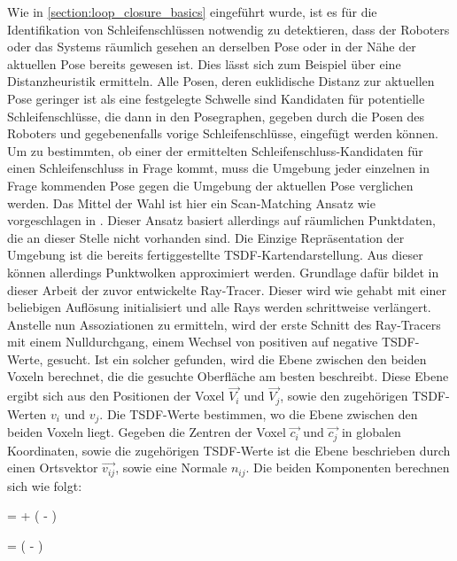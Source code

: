 Wie in \ref{section:loop_closure_basics} eingeführt wurde, ist es für die Identifikation von Schleifenschlüssen notwendig zu detektieren, dass der Roboters oder das Systems räumlich gesehen an derselben Pose oder in der Nähe der aktuellen Pose bereits gewesen ist. Dies lässt sich zum Beispiel über eine Distanzheuristik ermitteln. Alle Posen, deren euklidische Distanz zur aktuellen Pose geringer ist als eine festgelegte Schwelle sind Kandidaten für potentielle Schleifenschlüsse, die dann in den Posegraphen, gegeben durch die Posen des Roboters und gegebenenfalls vorige Schleifenschlüsse, eingefügt werden können. Um zu bestimmten, ob einer der ermittelten Schleifenschluss-Kandidaten für einen Schleifenschluss in Frage kommt, muss die Umgebung jeder einzelnen in Frage kommenden Pose gegen die Umgebung der aktuellen Pose verglichen werden. Das Mittel der Wahl ist hier ein Scan-Matching Ansatz wie vorgeschlagen in \cite{lu1997globally,shan2020lio,borrmann2008globally}. Dieser Ansatz basiert allerdings auf räumlichen Punktdaten, die an dieser Stelle nicht vorhanden sind. Die Einzige Repräsentation der Umgebung ist die bereits fertiggestellte TSDF-Kartendarstellung. Aus dieser können allerdings Punktwolken approximiert werden. Grundlage dafür bildet in dieser Arbeit der zuvor entwickelte Ray-Tracer. Dieser wird wie gehabt mit einer beliebigen Auflösung initialisiert und alle Rays werden schrittweise verlängert. Anstelle nun Assoziationen zu ermitteln, wird der erste Schnitt des Ray-Tracers mit einem Nulldurchgang, einem Wechsel von positiven auf negative TSDF-Werte, gesucht. Ist ein solcher gefunden, wird die Ebene zwischen den beiden Voxeln berechnet, die die gesuchte Oberfläche am besten beschreibt. Diese Ebene ergibt sich aus den Positionen der Voxel $\vec{V_i}$ und $\vec{V_j}$, sowie den zugehörigen TSDF-Werten $v_i$ und $v_j$. Die TSDF-Werte bestimmen, wo die Ebene zwischen den beiden Voxeln liegt. Gegeben die Zentren der Voxel $\vec{c_i}$ und $\vec{c_j}$ in globalen Koordinaten, sowie die zugehörigen TSDF-Werte ist die Ebene beschrieben durch einen Ortsvektor $\vec{v_{ij}}$, sowie eine Normale $n_{ij}$. Die beiden Komponenten berechnen sich wie folgt:

\begin{myequation}
 =  + \left( - \right) \cdot {}
\end{myequation}

\begin{myequation}
 = \left( - \right)
\end{myequation}

